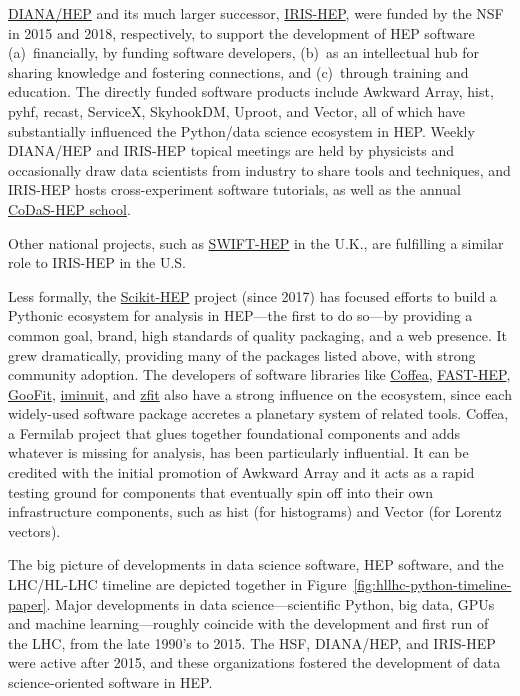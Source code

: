 \documentclass{article}
\begin{document}
\href{http://diana-hep.org/}{DIANA/HEP} and its much larger successor, \href{https://iris-hep.org/}{IRIS-HEP}, were funded by the NSF in 2015 and 2018, respectively, to support the development of HEP software (a)~financially, by funding software developers, (b)~as an intellectual hub for sharing knowledge and fostering connections, and (c)~through training and education. The directly funded software products include Awkward Array, hist, pyhf, recast, ServiceX, SkyhookDM, Uproot, and Vector, all of which have substantially influenced the Python/data science ecosystem in HEP. Weekly DIANA/HEP and IRIS-HEP topical meetings are held by physicists and occasionally draw data scientists from industry to share tools and techniques, and IRIS-HEP hosts cross-experiment software tutorials, as well as the annual \href{http://codas-hep.org/}{CoDaS-HEP school}.

Other national projects, such as \href{https://gtr.ukri.org/projects?ref=ST\%2FV002562\%2F1}{SWIFT-HEP} in the U.K., are fulfilling a similar role to IRIS-HEP in the U.S.

Less formally, the \href{https://scikit-hep.org/}{Scikit-HEP} project (since 2017) has focused efforts to build a Pythonic ecosystem for analysis in HEP---the first to do so---by providing a common goal, brand, high standards of quality packaging, and a web presence. It grew dramatically, providing many of the packages listed above, with strong community adoption. The developers of software libraries like \href{https://coffeateam.github.io/coffea/}{Coffea}, \href{https://fast-hep.web.cern.ch/fast-hep/}{FAST-HEP}, \href{https://goofit.github.io/}{GooFit}, \href{https://iminuit.readthedocs.io/}{iminuit}, and \href{https://zfit.readthedocs.io/en/latest/}{zfit} also have a strong influence on the ecosystem, since each widely-used software package accretes a planetary system of related tools. Coffea, a Fermilab project that glues together foundational components and adds whatever is missing for analysis, has been particularly influential. It can be credited with the initial promotion of Awkward Array and it acts as a rapid testing ground for components that eventually spin off into their own infrastructure components, such as hist (for histograms) and Vector (for Lorentz vectors).

The big picture of developments in data science software, HEP software, and the LHC/HL-LHC timeline are depicted together in Figure~\ref{fig:hllhc-python-timeline-paper}. Major developments in data science---scientific Python, big data, GPUs and machine learning---roughly coincide with the development and first run of the LHC, from the late 1990's to 2015. The HSF, DIANA/HEP, and IRIS-HEP were active after 2015, and these organizations fostered the development of data science-oriented software in HEP.
\end{document}
